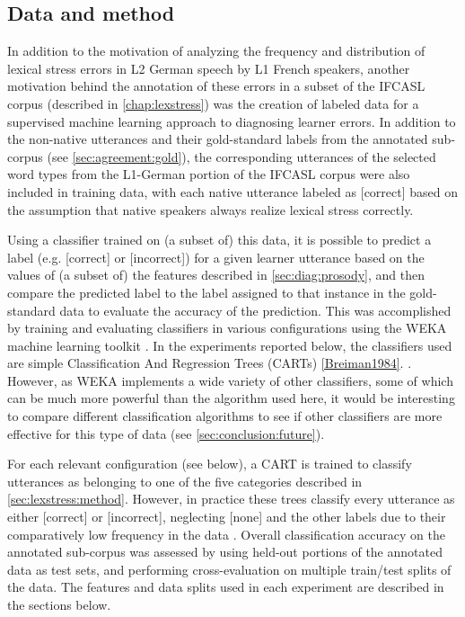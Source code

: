 	\subsection{Data and method}
	\label{sec:classification:datamethod}
		
		In addition to the motivation of analyzing the frequency and distribution of lexical stress errors in L2 German speech by L1 French speakers, another motivation behind the annotation of these errors in a subset of the IFCASL corpus (described in \cref{chap:lexstress}) was the creation of labeled data for a supervised machine learning approach to diagnosing learner errors. In addition to the non-native utterances and their gold-standard labels from the annotated sub-corpus (see \cref{sec:agreement:gold}), the corresponding utterances of the selected word types from the L1-German portion of the IFCASL corpus were also included in training data, with each native utterance labeled as [correct] based on the assumption that native speakers always realize lexical stress correctly.
		
		 Using a classifier trained on (a subset of) this data, it is possible to predict a label (e.g. [correct] or [incorrect]) for a given learner utterance based on the values of (a subset of) the features described in \cref{sec:diag:prosody}, and then compare the predicted label to the label assigned to that instance in the gold-standard data to evaluate the accuracy of the prediction. 
		This was accomplished by training and evaluating classifiers in various configurations using the WEKA machine learning toolkit \citep{Hall2009}. 	
		In the experiments reported below, 
		the classifiers used are
		simple Classification And Regression Trees (CARTs) \cref{Breiman1984}. 
		. 
		However, as WEKA implements a wide variety of other classifiers, some of which can be much more powerful than the algorithm used here, it would be interesting to compare different classification algorithms to see if other classifiers are more effective for this type of data (see \cref{sec:conclusion:future}).
		
		For each relevant configuration (see below), a CART is trained to classify utterances as belonging to one of the five categories described in \cref{sec:lexstress:method}. However, in practice these trees classify every utterance as either [correct] or [incorrect], neglecting [none] and the other labels due to their comparatively low frequency in the data .
		Overall classification accuracy on the annotated sub-corpus was assessed by using held-out portions of the annotated data as test sets, and performing cross-evaluation on multiple train/test splits of the data. The features and data splits used in each experiment are described in the sections below. 


